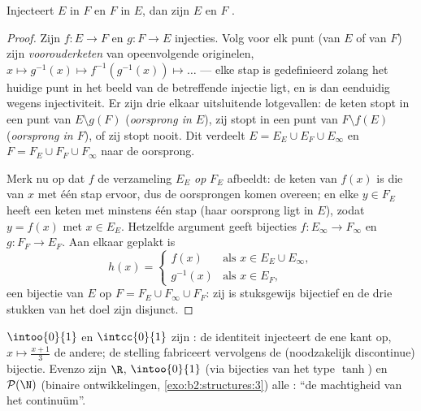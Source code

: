 \begin{theorem}\label{thm:b2:structures:cantorbernstein}
Injecteert $E$ in $F$ en $F$ in $E$, dan zijn $E$ en $F$
.
\end{theorem}

\begin{proof}
Zijn $f \colon E \to F$ en $g \colon F \to E$ injecties. Volg voor
elk punt (van $E$ of van $F$) zijn \emph{voorouderketen} van
opeenvolgende originelen, $x \mapsto g^{-1}(x) \mapsto
f^{-1}(g^{-1}(x)) \mapsto \dots$ --- elke stap is gedefinieerd
zolang het huidige punt in het beeld van de betreffende injectie
ligt, en is dan eenduidig wegens injectiviteit. Er zijn drie
elkaar uitsluitende lotgevallen: de keten stopt in een punt van $E
\setminus g(F)$ (\emph{oorsprong in $E$}), zij stopt in een punt
van $F \setminus f(E)$ (\emph{oorsprong in $F$}), of zij stopt
nooit. Dit verdeelt $E = E_E \cup E_F \cup E_\infty$ en $F = F_E
\cup F_F \cup F_\infty$ naar de oorsprong.

Merk nu op dat $f$ de verzameling $E_E$ \emph{op} $F_E$ afbeeldt:
de keten van $f(x)$ is die van $x$ met één stap ervoor, dus de
oorsprongen komen overeen; en elke $y \in F_E$ heeft een keten met
minstens één stap (haar oorsprong ligt in $E$), zodat $y = f(x)$
met $x \in E_E$. Hetzelfde argument geeft bijecties $f \colon
E_\infty \to F_\infty$ en $g \colon F_F \to E_F$. Aan elkaar
geplakt is
\[
h(x) =
\begin{cases}
f(x) & \text{als } x \in E_E \cup E_\infty,\\
g^{-1}(x) & \text{als } x \in E_F,
\end{cases}
\]
een bijectie van $E$ op $F = F_E \cup F_\infty \cup F_F$: zij is
stuksgewijs bijectief en de drie stukken van het doel zijn
disjunct.
\end{proof}

\begin{example}\label{ex:b2:structures:cbexample}
$\intoo{0}{1}$ en $\intcc{0}{1}$ zijn : de identiteit
injecteert de ene kant op, $x \mapsto \frac{x + 1}{3}$ de andere;
de stelling fabriceert vervolgens de (noodzakelijk discontinue)
bijectie. Evenzo zijn $\R$, $\intoo{0}{1}$ (via bijecties van het
type $\tanh$) en $\mathcal{P}(\N)$ (binaire ontwikkelingen,
\cref{exo:b2:structures:3}) alle : ``de machtigheid
van het continuüm''.
\end{example}

